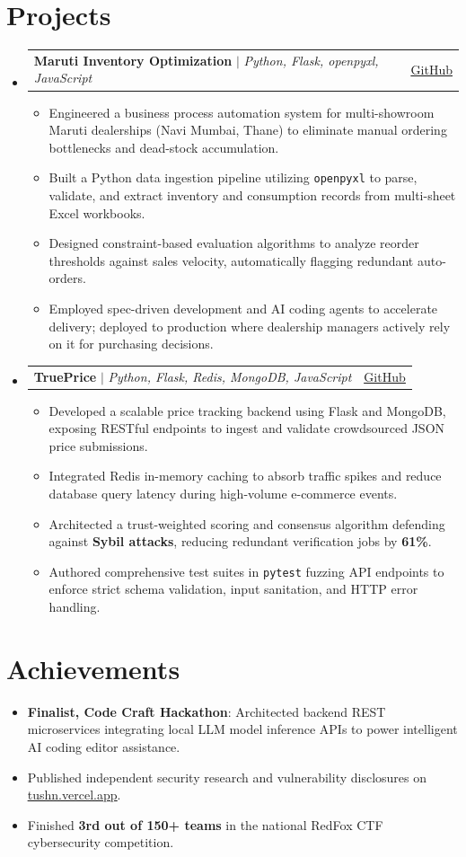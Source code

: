 \documentclass[letterpaper,11pt]{article}
\makeatletter
\newcommand{\resumeItem}[1]{
  \item\small{
    {#1 \vspace{-2pt}}
  }
}
\newcommand{\resumeProjectHeading}[2]{
    \item
    \begin{tabular*}{0.97\textwidth}{l@{\extracolsep{\fill}}r}
      \small#1 & #2 \\
    \end{tabular*}\vspace{-2pt}
}
\newcommand{\resumeSubHeadingListStart}{\begin{itemize}[leftmargin=0.15in, label={}, itemsep=3pt, parsep=0pt, topsep=0pt]}
\newcommand{\resumeSubHeadingListEnd}{\end{itemize}}
\newcommand{\resumeItemListStart}{\begin{itemize}[itemsep=1.5pt, parsep=0pt, topsep=3pt]}
\newcommand{\resumeItemListEnd}{\end{itemize}\vspace{-3pt}}
\makeatother
\begin{document}
\section{Projects}
    \resumeSubHeadingListStart
      \resumeProjectHeading
          {\textbf{Maruti Inventory Optimization} $|$ \emph{Python, Flask, openpyxl, JavaScript}}{\href{https://github.com/TushN101/ampl}{\underline{GitHub}}}
          \resumeItemListStart
            \resumeItem{Engineered a business process automation system for multi-showroom Maruti dealerships (Navi Mumbai, Thane) to eliminate manual ordering bottlenecks and dead-stock accumulation.}
            \resumeItem{Built a Python data ingestion pipeline utilizing \texttt{openpyxl} to parse, validate, and extract inventory and consumption records from multi-sheet Excel workbooks.}
            \resumeItem{Designed constraint-based evaluation algorithms to analyze reorder thresholds against sales velocity, automatically flagging redundant auto-orders.}
            \resumeItem{Employed spec-driven development and AI coding agents to accelerate delivery; deployed to production where dealership managers actively rely on it for purchasing decisions.}
          \resumeItemListEnd
      \resumeProjectHeading
          {\textbf{TruePrice} $|$ \emph{Python, Flask, Redis, MongoDB, JavaScript}}{\href{https://github.com/TushN101/TruePrice}{\underline{GitHub}}}
          \resumeItemListStart
            \resumeItem{Developed a scalable price tracking backend using Flask and MongoDB, exposing RESTful endpoints to ingest and validate crowdsourced JSON price submissions.}
            \resumeItem{Integrated Redis in-memory caching to absorb traffic spikes and reduce database query latency during high-volume e-commerce events.}
            \resumeItem{Architected a trust-weighted scoring and consensus algorithm defending against \textbf{Sybil attacks}, reducing redundant verification jobs by \textbf{61\%}.}
            \resumeItem{Authored comprehensive test suites in \texttt{pytest} fuzzing API endpoints to enforce strict schema validation, input sanitation, and HTTP error handling.}
          \resumeItemListEnd
    \resumeSubHeadingListEnd

\section{Achievements}
 \resumeItemListStart
     \resumeItem{\textbf{Finalist, Code Craft Hackathon}: Architected backend REST microservices integrating local LLM model inference APIs to power intelligent AI coding editor assistance.}
     \resumeItem{Published independent security research and vulnerability disclosures on \href{https://tushn.vercel.app}{\underline{tushn.vercel.app}}.}
     \resumeItem{Finished \textbf{3rd out of 150+ teams} in the national RedFox CTF cybersecurity competition.}
 \resumeItemListEnd

\end{document}
